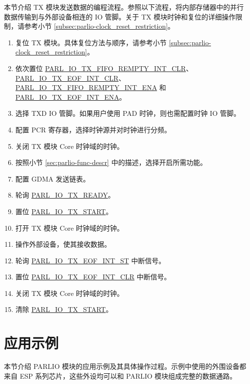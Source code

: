 \documentclass[main\_\_CN.tex]{subfiles}
\begin{document}
本节介绍 TX 模块发送数据的编程流程。参照以下流程，将内部存储器中的并行数据传输到与外部设备相连的 IO 管脚。关于 TX 模块时钟和复位的详细操作限制，请参考小节 \ref{subsec:parlio-clock_reset_restriction}。

\begin{enumerate}
    \item 复位 TX 模块。具体复位方法与顺序，请参考小节 \ref{subsec:parlio-clock_reset_restriction}。
    \item 依次置位 \hyperref[fielddesc:PARLIOTXFIFOREMPTYINTCLR]{PARL\_IO\_TX\_FIFO\_REMPTY\_INT\_CLR}、\hyperref[fielddesc:PARLIOTXEOFINTCLR]{PARL\_IO\_TX\_EOF\_INT\_CLR}、\hyperref[fielddesc:PARLIOTXFIFOREMPTYINTENA]{PARL\_IO\_TX\_FIFO\_REMPTY\_INT\_ENA} 和 \hyperref[fielddesc:PARLIOTXEOFINTENA]{PARL\_IO\_TX\_EOF\_INT\_ENA}。
    \item 选择 TXD IO 管脚。如果用户使用 PAD 时钟，则也需配置时钟 IO 管脚。
    \item 配置 PCR 寄存器，选择时钟源并对时钟进行分频。
    \item 关闭 TX 模块 Core 时钟域的时钟。
    \item 按照小节 \ref{sec:parlio-func-descr} 中的描述，选择开启所需功能。
    \item 配置 GDMA 发送链表。
    \item 轮询 \hyperref[fielddesc:PARLIOTXREADY]{PARL\_IO\_TX\_READY}。
    \item 置位 \hyperref[fielddesc:PARLIOTXSTART]{PARL\_IO\_TX\_START}。
    \item 打开 TX 模块 Core 时钟域的时钟。
    \item 操作外部设备，使其接收数据。
    \item 轮询 \hyperref[fielddesc:PARLIOTXEOFINTST]{PARL\_IO\_TX\_EOF\_INT\_ST} 中断信号。
    \item 置位 \hyperref[fielddesc:PARLIOTXEOFINTCLR]{PARL\_IO\_TX\_EOF\_INT\_CLR} 中断信号。
    \item 关闭 TX 模块 Core 时钟域的时钟。
    \item 清除 \hyperref[fielddesc:PARLIOTXSTART]{PARL\_IO\_TX\_START}。
\end{enumerate}


\section{应用示例}
\label{sec:parlio-application-example}

本节介绍 PARLIO 模块的应用示例及其具体操作过程。示例中使用的外围设备都来自 ESP 系列芯片，这些外设均可以和 PARLIO 模块组成完整的数据通路。
\end{document}

